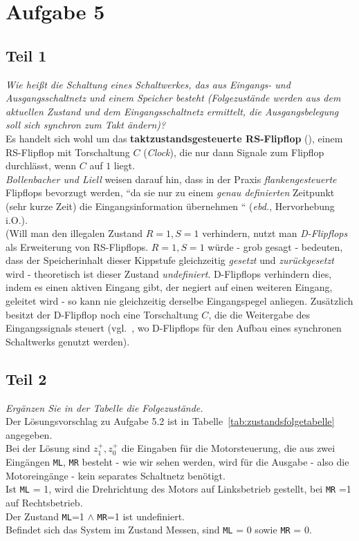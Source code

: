 \chapter{Aufgabe 5}

\section{Teil 1}


\textit{Wie heißt die Schaltung eines Schaltwerkes, das aus Eingangs- und
Ausgangsschaltnetz und einem Speicher besteht (Folgezustände werden
aus dem aktuellen Zustand und dem Eingangsschaltnetz ermittelt, die
Ausgangsbelegung soll sich synchron zum Takt ändern)?}\\

\noindent
Es handelt sich wohl um das \textbf{taktzustandsgesteuerte RS-Flipflop} (\cite[65 f.]{ES1}), einem RS-Flipflop mit Torschaltung $C$ (\textit{Clock}), die nur dann Signale zum Flipflop durchlässt, wenn $C$ auf $1$ liegt.\\
\textit{Bollenbacher und Liell} weisen darauf hin, dass in der Praxis \textit{flankengesteuerte} Flipflops bevorzugt werden, ``da sie nur zu einem \textit{genau definierten} Zeitpunkt (sehr kurze Zeit) die Eingangsinformation übernehmen `` (\textit{ebd.}, Hervorhebung i.O.).\\

\noindent
(Will man den illegalen Zustand $R=1, S=1$ verhindern, nutzt man \textit{D-Flipflops} als Erweiterung von RS-Flipflops. $R=1, S=1$ würde - grob gesagt - bedeuten, dass der Speicherinhalt dieser Kippstufe gleichzeitig \textit{gesetzt} und \textit{zurückgesetzt} wird - theoretisch ist dieser Zustand \textit{undefiniert}.
D-Flipflops verhindern dies, indem es einen aktiven Eingang gibt, der negiert auf einen weiteren Eingang, geleitet wird - so kann nie gleichzeitig derselbe Eingangspegel anliegen.
Zusätzlich besitzt der D-Flipflop noch eine Torschaltung $C$, die die Weitergabe des Eingangssignals steuert (vgl.~\cite[69]{ES1}, wo D-Flipflops für den Aufbau eines synchronen Schaltwerks genutzt werden).


\section{Teil 2}

\textit{Ergänzen Sie in der Tabelle die Folgezustände.}\\

\noindent
Der Lösungsvorschlag zu Aufgabe 5.2 ist in Tabelle~\ref{tab:zustandsfolgetabelle} angegeben.\\
Bei der Lösung sind $z_1^+, z_0^+$ die Eingaben für die Motorsteuerung, die aus zwei Eingängen \texttt{ML}, \texttt{MR} besteht - wie wir  sehen werden, wird für die Ausgabe - also die Motoreingänge - kein separates Schaltnetz benötigt.\\
Ist \texttt{ML} = 1, wird die Drehrichtung des Motors auf Linksbetrieb gestellt, bei \texttt{MR} =1 auf Rechtsbetrieb.\\
Der Zustand \texttt{ML}=1 $\land$ \texttt{MR}=1 ist undefiniert.\\
Befindet sich das System im Zustand Messen, sind \texttt{ML} = 0 sowie  \texttt{MR} = 0.

